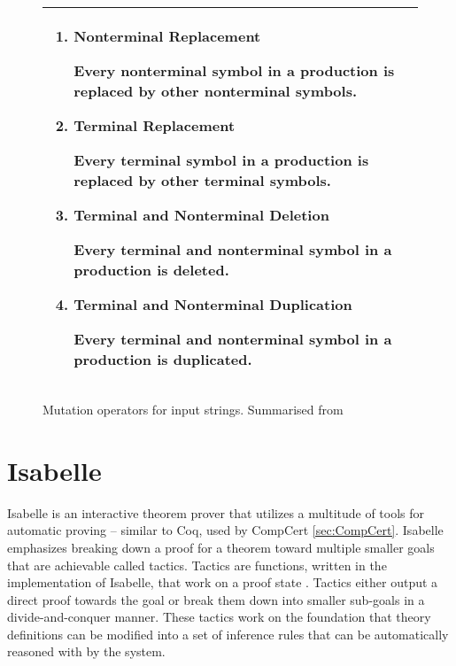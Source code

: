 \begin{figure}[!htb]
    \begin{tabular}{|L{0.95\textwidth}|}
        \hline
        \begin{enumerate}
            \item \textbf{Nonterminal Replacement}
            
            Every nonterminal symbol in a production is replaced by other nonterminal symbols.
    
            \item \textbf{Terminal Replacement}
            
            Every terminal symbol in a production is replaced by other terminal symbols.
    
            \item \textbf{Terminal and Nonterminal Deletion}
            
            Every terminal and nonterminal symbol in a production is deleted.
    
            \item \textbf{Terminal and Nonterminal Duplication}
            
            Every terminal and nonterminal symbol in a production is duplicated.
        \end{enumerate} \\
        \hline
    \end{tabular}

    \caption{Mutation operators for input strings. Summarised from \cite[Sec. 6.2]{offutt_mutation_2006}}
    \label{fig:MutationOperators}
\end{figure}

\section{Isabelle}
\label{sec:Isabelle}

Isabelle is an interactive theorem prover that utilizes a multitude of tools for automatic proving -- similar to Coq, used by CompCert 
\ref{sec:CompCert}. Isabelle emphasizes breaking down a proof 
for a theorem toward multiple smaller goals that are achievable called tactics. Tactics are functions, written in the implementation of Isabelle, 
that work on a proof state \cite{isabelleProof}. Tactics either output a direct proof towards the goal or break them down into smaller sub-goals 
in a divide-and-conquer manner. These tactics work on the foundation that theory definitions can be modified into a set of inference rules that 
can be automatically reasoned with by the system.

